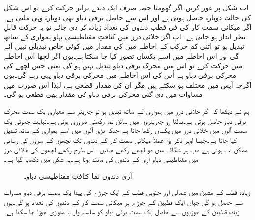اب شکل   پر غور کریں۔اگر گھومتا حصہ صرف ایک دندے برابر حرکت کرے تو اس شکل کی حالت  دوبارہ حاصل ہوتی ہے اور اس سے حاصل برقی دباو بھی دوبارہ وہی ملتی ہے۔اگر میکانی سمت کار کی فی قطب دندوں کی تعداد زیادہ کر دی جائے تو یہ حرکت قابلِ نظر انداز ہو جاتی ہے۔ اب اگر خلائی درز میں کثافتِ مقناطیسی بہاو ہمواری کے ساتھ تبدیل ہو تو اتنی کم حرکت کے احاطے میں  کی مقدار میں کوئی خاص تبدیلی نہیں آئے گی اور اس احاطے میں اسے یکساں تصور کیا جا سکتا ہے۔یوں اگر لچھا اس احاطے میں حرکت کرے تو اس میں محرک برقی دباو تبدیل نہیں ہو گی۔یعنی جس لچھے کی محرکی برقی دباو  ہے اُس کی اس احاطے میں محرکی برقی دباو یہی رہے گی۔یوں اگرچہ  آپس میں مختلف ہو سکتے ہیں مگر ان کی مقدار قطعی ہے، لہٰذا اس صورت میں مساوات   میں دی گئی محرکی برقی دباو کی مقدار بھی قطعی ہو گی۔ 

ہم نے دیکھا کہ اگر خلائی درز میں  ہمواری کے ساتھ تبدیل ہو تو جنریٹر سے معیاری یک سمت  محرک برقی دباو حاصل ہوتی ہے۔بدلتا رو جنریٹروں میں  سائن نما رکھنی ضروری ہوتی ہے۔نہایت چھوٹی یک سمت  آلوں میں خلائی درز میں   یکساں رکھا جاتا ہے جبکہ بڑی آلوں میں اسے ہمواری کے ساتھ تبدیل کیا جاتا ہے۔جیسا اوپر ذکر ہوا عملاً میکانی سمت کار کے دندوں تک لچھوں کے سروں کی رسائی ممکن تب ہوتی ہے جب ہر شگاف میں دو لچھے رکھے جائیں۔ اس طرح رکھے لچھوں کی خلائی درز میں مقناطیسی دباو آری کے دندوں کی مانند ہوتا ہے۔یہ شکل   میں دکھایا گیا ہے۔
\begin{figure}
\centering
\caption{آری دندوں نما کثافتِ مقناطیسی دباو۔}
\label{شکل_یکسمتی_آری_دندوں_نما_دباو}
\end{figure}

زیادہ قطب کے مشین میں شمالی اور جنوبی قطب کے ایک جوڑے کی پیدا یک سمت  برقی دباو مساوات   سے حاصل ہو گی جہاں  ایک قطبین کے جوڑے پر میکانی سمت کار کے دندوں کی تعداد ہو گی۔یوں زیادہ قطبین کے جوڑیوں سے حاصل یک سمت  برقی دباو کو سلسلہ وار یا متوازی جوڑا جا سکتا ہے۔

